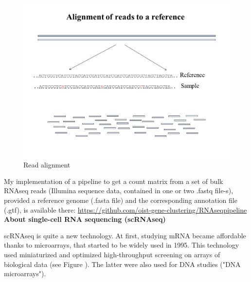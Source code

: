 \documentclass{report}
\begin{document}
\begin{figure}[H]
\centering
\includegraphics[scale=0.45]{illustrations/alignment.jpg}
\caption{Read alignment}
\label{alignment}
\end{figure}

My implementation of a pipeline to get a count matrix from a set of bulk RNAseq reads (Illumina sequence data, contained in one or two .fastq file-s), provided a reference genome (.fasta file) and the corresponding annotation file (.gtf), is available there: {\url{https://github.com/oist-gene-clustering/RNAseqpipeline}}\\ 

\bigskip
\noindent \textbf{About single-cell RNA sequencing (scRNAseq)}
\bigskip

scRNAseq is quite a new technology. At first, studying mRNA became affordable thanks to microarrays\cite{chang1983binding}, that started to be widely used in 1995\cite{schena1995quantitative}. This technology used miniaturized and optimized high-throughput screening on arrays of biological data\cite{microarraywiki} (see Figure \label{microarray}). The latter were also used for DNA studies ("DNA microarrays"\cite{southern2001dna}). 
\end{document}
